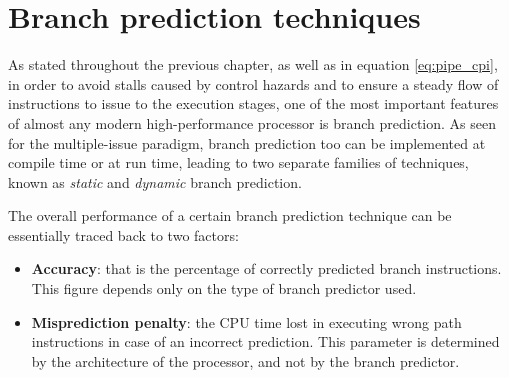 \chapter{Branch prediction techniques}
As stated throughout the previous chapter, as well as in equation \eqref{eq:pipe_cpi}, in order to avoid stalls caused by control hazards and to ensure a steady flow of instructions to issue to the execution stages, one of the most important features of almost any modern high-performance processor is branch prediction. As seen for the multiple-issue paradigm, branch prediction too can be implemented at compile time or at run time, leading to two separate families of techniques, known as \emph{static} and \emph{dynamic} branch prediction.

The overall performance of a certain branch prediction technique can be essentially traced back to two factors:
\begin{itemize}
  \item \textbf{Accuracy}: that is the percentage of correctly predicted branch instructions. This figure depends only on the type of branch predictor used.
  \item \textbf{Misprediction penalty}: the CPU time lost in executing wrong path instructions in case of an incorrect prediction. This parameter is determined by the architecture of the processor, and not by the branch predictor.
\end{itemize}

